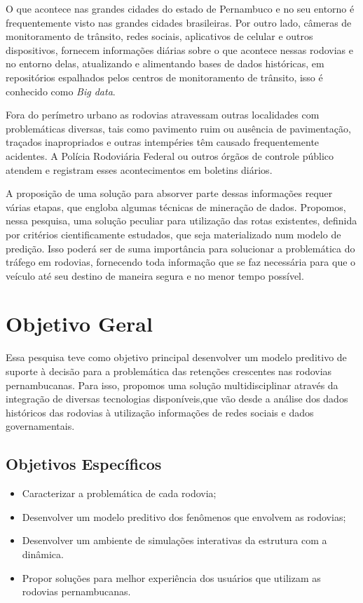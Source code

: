 O que acontece nas grandes cidades do estado de Pernambuco e no seu entorno é frequentemente visto nas grandes cidades brasileiras.
Por outro lado, câmeras de monitoramento de trânsito, redes sociais, aplicativos de celular e outros dispositivos, fornecem informações diárias sobre o que acontece nessas 
rodovias e no entorno delas, atualizando e alimentando bases de dados históricas, em repositórios espalhados pelos centros de 
monitoramento de trânsito, isso é conhecido como \textit{Big data}.

Fora do perímetro urbano as rodovias atravessam outras localidades com problemáticas diversas, tais como pavimento ruim ou ausência de pavimentação, 
traçados inapropriados e outras intempéries têm causado frequentemente acidentes.
A Polícia Rodoviária Federal ou outros órgãos de controle público atendem e registram esses acontecimentos em boletins diários.

A proposição de uma solução para absorver parte dessas informações requer várias etapas, que engloba algumas técnicas de mineração de dados.
Propomos, nessa pesquisa, uma solução peculiar para utilização das rotas existentes, definida por critérios cientificamente estudados, que seja materializado num modelo de predição.
Isso poderá ser de suma importância para solucionar a problemática do tráfego em rodovias, fornecendo toda informação que se faz necessária para que o veículo até seu destino de maneira segura e no menor tempo possível.


\section{ Objetivo Geral}\label{intro:objetivo}

Essa pesquisa teve como objetivo principal desenvolver um modelo preditivo de suporte à decisão para a problemática das retenções crescentes nas rodovias pernambucanas. 
Para isso, propomos uma solução multidisciplinar através da integração de diversas tecnologias disponíveis,que vão desde a análise dos dados históricos das 
rodovias à utilização informações de redes sociais e dados governamentais.

\subsection{ Objetivos Específicos}\label{intro:especificos}

\begin{itemize}
 \item Caracterizar a problemática de cada rodovia; 
 \item Desenvolver um modelo preditivo dos fenômenos que envolvem as rodovias;
 \item Desenvolver um ambiente de simulações interativas da estrutura com a dinâmica.
 \item Propor soluções para melhor experiência dos usuários que utilizam as rodovias pernambucanas.
\end{itemize}










